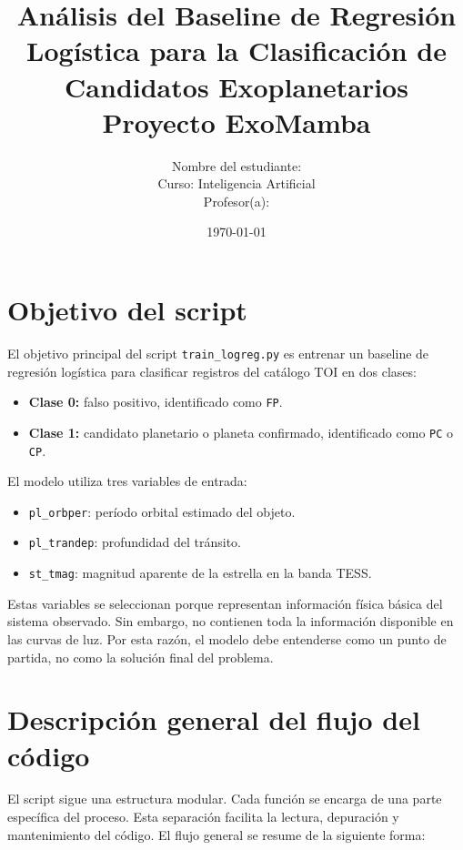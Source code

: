 \documentclass[12pt,letterpaper]{article}
\title{
    \textbf{Análisis del Baseline de Regresión Logística para la Clasificación de Candidatos Exoplanetarios}\\
    \large Proyecto ExoMamba
}
\author{
    Nombre del estudiante: \underline{\hspace{7cm}}\\
    Curso: Inteligencia Artificial\\
    Profesor(a): \underline{\hspace{7cm}}
}
\date{\today}
\begin{document}
\newpage

\tableofcontents

\newpage

\section{Objetivo del script}

El objetivo principal del script \texttt{train\_logreg.py} es entrenar un baseline de regresión logística para clasificar registros del catálogo TOI en dos clases:

\begin{itemize}
    \item \textbf{Clase 0:} falso positivo, identificado como \texttt{FP}.
    \item \textbf{Clase 1:} candidato planetario o planeta confirmado, identificado como \texttt{PC} o \texttt{CP}.
\end{itemize}

El modelo utiliza tres variables de entrada:

\begin{itemize}
    \item \texttt{pl\_orbper}: período orbital estimado del objeto.
    \item \texttt{pl\_trandep}: profundidad del tránsito.
    \item \texttt{st\_tmag}: magnitud aparente de la estrella en la banda TESS.
\end{itemize}

Estas variables se seleccionan porque representan información física básica del sistema observado. Sin embargo, no contienen toda la información disponible en las curvas de luz. Por esta razón, el modelo debe entenderse como un punto de partida, no como la solución final del problema.

\section{Descripción general del flujo del código}

El script sigue una estructura modular. Cada función se encarga de una parte específica del proceso. Esta separación facilita la lectura, depuración y mantenimiento del código. El flujo general se resume de la siguiente forma:
\end{document}
